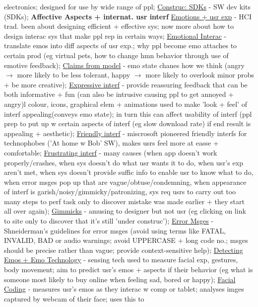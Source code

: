 \documentclass[a4paper]{article}
\begin{document}
\begin{multicols}{3}
        electronics; designed for use by wide range of ppl; \underline{Construc: SDKs} - SW dev kits (SDKs); \newline \textbf{Affective Aspects + internat. usr interf} \underline{Emotions + usr exp} - HCI
        trad. been about designing efficient + effective sys; now more about how to design interac sys that make ppl rep in certain ways; \underline{Emotional Interac} - translate emos into diff aspects of usr
        exp.; why ppl become emo attaches to certain prod (eg virtual pets, how to change hmn behavior through use of emotive feedback); \underline{Claims from model} - emo state chanes how we think (angry $\to$ more likely
        to be less tolerant, happy $\to$ more likely to overlook minor probs + be more creative); \underline{Expressive interf} - provide reassuring feedback that can be both informative + fun (can also be intrusive
        causing ppl to get annoyed + angry)l colour, icons,  graphical elem + animations used to make 'look + feel' of interf appealing(conveys emo state); in turn this can affect usability of interf (ppl
        prep to put up w certain aspects of interf (eg slow download rate) if end result is appealing + aesthetic); \underline{Friendly interf} - miscrosoft pioneered friendly interfs for technophobes ('At home w
        Bob' SW), makes usrs feel more at easse + comfortable; \underline{Frustrating interf} - many causes (when app doesn't work properly/crashes, when sys doesn't do what usr wants it to do, when
        usr's exp aren't met, when sys doesn't provide suffic info to enable usr to know what to do, when error msges pop up that are vague/obtuse/condemning, when appearance of interf is
        garish/noisy/gimmicky/patronizing, sys req usrs to carry out too many steps to perf task only to discover mistake was made earlier + they start all over again); \underline{Gimmicks} -
        amusing to designer but not usr (eg clicking on link to site only to discover that it's still 'under construc'); \underline{Error Msges} - Shneiderman's guidelines for error msges (avoid
        using terms like FATAL, INVALID, BAD or audio warnings; avoid UPPERCASE + long code no.; msges should be precise rather than vague; provide context-sensitive help); \underline{Detecting Emos
        + Emo Technology} - sensing tech used to measure facial exp, gestures, body movement; aim to predict usr's emos + aspects if their behavior (eg what is someone most
        likely to buy online when feeling sad, bored or happy); \underline{Facial Coding} - measures usr's emos as they interac w comp or tablet; analyses imges captured by webcam of their face; uses this to

\end{multicols}
\end{document}
